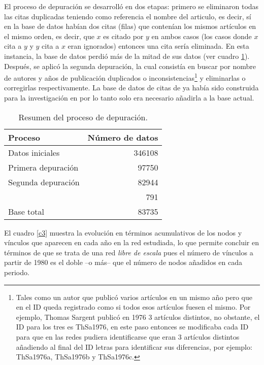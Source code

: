 \documentclass[12pt,letter]{article}
\begin{document}
El proceso de depuración se desarrolló en dos etapas: primero se eliminaron todas las citas duplicadas teniendo como referencia el nombre del articulo, es decir, sí en la base de datos habían dos citas (filas) que contenían los mismos artículos en el mismo orden, es decir, que $x$ es citado por $y$ en ambos casos (los casos donde $x$ cita a $y$ y $y$ cita a $x$ eran ignorados) entonces una cita sería eliminada. En esta instancia, la base de datos perdió más de la mitad de sus datos (ver cuadro \ref{c2}). Después, se aplicó la segunda depuración, la cual consistía en buscar por nombre de autores y años de publicación duplicados o inconsistencias\footnote{Tales como un autor que publicó varios artículos en un mismo año pero que en el ID queda registrado como si todos esos artículos fuesen el mismo. Por ejemplo, Thomas Sargent publicó en 1976 3 artículos distintos, no obstante, el ID para los tres es ThSa1976, en este paso entonces se modificaba cada ID para que en las redes pudiera identificarse que eran 3 artículos distintos añadiendo al final del ID letras para identificar sus diferencias, por ejemplo: ThSa1976a, ThSa1976b y ThSa1976c.} y eliminarlas o corregirlas respectivamente. La base de datos de citas de \cite{Lucas1} ya había sido construida para la investigación en \citep{Salazar1} por lo tanto solo era necesario añadirla a la base actual.

\vspace{0.5cm}

\begin{table}[h!]
\centering
\begin{tabular}{lr}
\textbf{Proceso} & \textbf{Número de datos}\\ \hline 
   Datos iniciales & 346108\\
   Primera depuración & 97750\\
   Segunda depuración  &  82944\\
    \cite{Lucas1}  &  791\\
    Base total  & 83735 \\ \hline
\end{tabular}
\caption{\small{Resumen del proceso de depuración}.} 
\label{c2}
\end{table}

\vspace{0.5cm}

El cuadro \ref{c3} muestra la evolución en términos acumulativos de los nodos y vínculos que aparecen en cada año en la red estudiada, lo que permite concluir en términos de \cite{Barabasi1} que se trata de una red \emph{libre de escala} pues el número de vínculos a partir de 1980 es el doble --o más-- que el número de nodos añadidos en cada periodo. 
\end{document}
